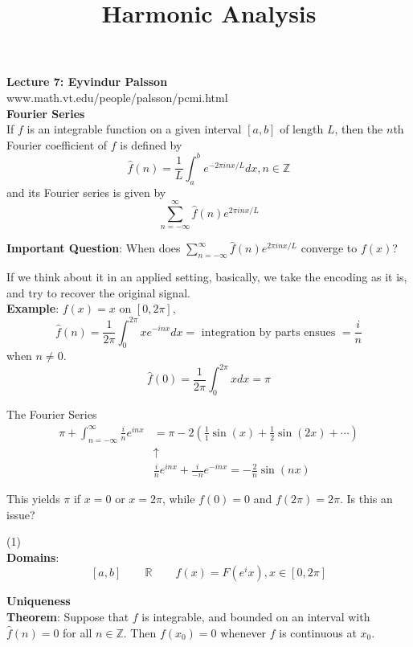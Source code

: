 \documentclass[12pt]{article}
\title{Harmonic Analysis}
\begin{document}
\noindent \textbf{Lecture 7: Eyvindur Palsson} \\
\noindent www.math.vt.edu/people/palsson/pcmi.html \\

\noindent \textbf{Fourier Series} \\
\noindent If $f$ is an integrable function on a given interval $[a,b]$ of length $L$, then the $n$th Fourier coefficient of $f$ is defined by 
$$ \hat{f}(n) = \frac{1}{L}\int^b_a e^{-2\pi inx/L}dx, n \in \mathbb{Z}$$
and its Fourier series is given by 
$$\sum^\infty_{n=-\infty} \hat{f}(n) e^{2\pi inx/L}$$

\noindent \textbf{Important Question}: When does $\sum^\infty_{n=-\infty} \hat{f}(n) e^{2\pi inx/L}$ converge to $f(x)$?

\noindent If we think about it in an applied setting, basically, we take the encoding as it is, and try to recover the original signal. \\

\noindent \textbf{Example}: $f(x)=x$ on $[0,2\pi]$, 
$$\hat{f}(n) = \frac{1}{2\pi} \int^{2\pi}_0 x e^{-inx} dx = \text{ integration by parts ensues } = \frac{i}{n}$$
when $n \not = 0$. 
$$\hat{f}(0) = \frac{1}{2\pi} \int^{2 \pi}_0 x dx = \pi$$

\noindent The Fourier Series \\
\begin{align*}
\pi + \int^\infty_{n=-\infty} \frac{i}{n} e^{inx} &= \pi - 2 (\frac{1}{1} \sin(x) + \frac{1}{2} \sin (2x) + \cdots) \\
&\uparrow \\
& \frac{i}{n}e^{inx} + \frac{i}{-n} e^{-inx} = -\frac{2}{n} \sin(nx)
\end{align*}

\noindent This yields $\pi$ if $x=0$ or $x=2\pi$, while $f(0)=0$ and $f(2\pi)=2\pi$. Is this an issue?

(1) \\

\noindent \textbf{Domains}:
$$[a,b] \hspace{25pt} \mathbb{R} \hspace{25pt} f(x) = F(e^ix), x \in [0,2\pi]$$

\noindent \textbf{Uniqueness} \\
\noindent \textbf{Theorem}: Suppose that $f$ is integrable, and bounded on an interval with $\hat{f}(n)=0$ for all $n \in \mathbb{Z}$. Then $f(x_0)=0$ whenever $f$ is continuous at $x_0$. \\
\end{document}
